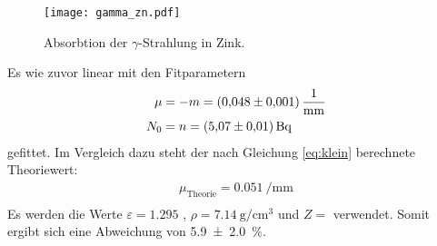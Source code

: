 \noindent
\begin{figure}[H]
  \centering
  \texttt{[image: gamma\_zn.pdf]}
  \caption{Absorbtion der $\gamma$-Strahlung in Zink.}
  \label{fig:gamma_zn}
\end{figure}
\noindent
Es wie zuvor linear
mit den Fitparametern
\begin{align}
    \mu &= -m = \SI{0.048\pm0.001}{\per\milli\meter} \\
    N_0 &= n = \SI{5.07\pm0.01}{\becquerel}
\end{align}
gefittet.
Im Vergleich dazu steht der nach Gleichung \eqref{eq:klein} berechnete Theoriewert:
\begin{align}
    \mu_\text{Theorie} = \SI{0.051}{\per\milli\meter} \\
\end{align}
Es werden die Werte $\varepsilon = \num{1.295}$ \cite{v704}, $\rho = \SI{7.14}{\gram\per\centi\meter\cubed}$ \cite{zink_dichte} und $Z=\num{}$ verwendet.
Somit ergibt sich eine Abweichung von \SI{5.9\pm2.0}{\percent}.
%
